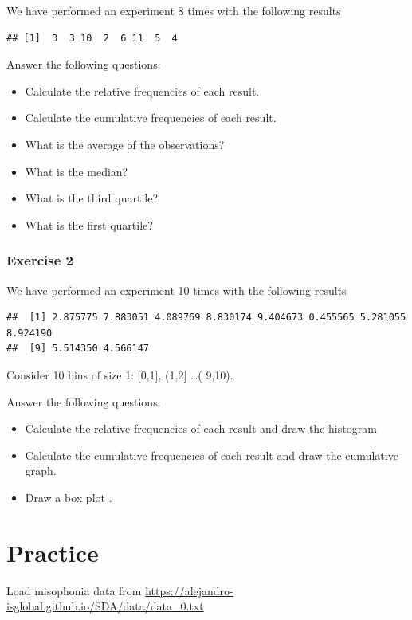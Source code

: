 \documentclass[
]{book}
\providecommand{\tightlist}{%
  \setlength{\itemsep}{0pt}\setlength{\parskip}{0pt}}
\begin{document}
We have performed an experiment 8 times with the following results

\begin{verbatim}
## [1]  3  3 10  2  6 11  5  4
\end{verbatim}

Answer the following questions:

\begin{itemize}
\tightlist
\item
  Calculate the relative frequencies of each result.
\item
  Calculate the cumulative frequencies of each result.
\item
  What is the average of the observations?
\item
  What is the median?
\item
  What is the third quartile?
\item
  What is the first quartile?
\end{itemize}

\hypertarget{exercise-2}{%
\subsubsection{Exercise 2}\label{exercise-2}}

We have performed an experiment 10 times with the following results

\begin{verbatim}
##  [1] 2.875775 7.883051 4.089769 8.830174 9.404673 0.455565 5.281055 8.924190
##  [9] 5.514350 4.566147
\end{verbatim}

Consider 10 bins of size 1: {[}0,1{]}, (1,2{]} \ldots( 9,10).

Answer the following questions:

\begin{itemize}
\item
  Calculate the relative frequencies of each result and draw the histogram
\item
  Calculate the cumulative frequencies of each result and draw the cumulative graph.
\item
  Draw a box plot .
\end{itemize}

\hypertarget{practice}{%
\section{Practice}\label{practice}}

Load misophonia data from \url{https://alejandro-isglobal.github.io/SDA/data/data_0.txt}
\end{document}
